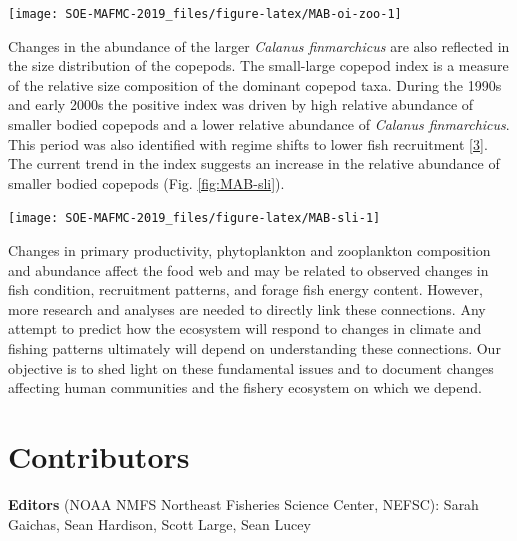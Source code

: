 \documentclass[10pt,]{article}
\let\origfigure\figure
\let\endorigfigure\endfigure
\renewenvironment{figure}[1][2] {
    \expandafter\origfigure\expandafter[H]
} {
    \endorigfigure
}
\begin{document}
\begin{figure}

{\centering \texttt{[image: SOE-MAFMC-2019\_files/figure-latex/MAB-oi-zoo-1]} 

}

\caption{Seasonal abundance of key zooplankton species in the MAB.}\label{fig:MAB-oi-zoo}
\end{figure}

Changes in the abundance of the larger \emph{Calanus finmarchicus} are
also reflected in the size distribution of the copepods. The small-large
copepod index is a measure of the relative size composition of the
dominant copepod taxa. During the 1990s and early 2000s the positive
index was driven by high relative abundance of smaller bodied copepods
and a lower relative abundance of \emph{Calanus finmarchicus}. This
period was also identified with regime shifts to lower fish recruitment
{[}\protect\hyperlink{ref-perretti_regime_2017}{3}{]}. The current trend
in the index suggests an increase in the relative abundance of smaller
bodied copepods (Fig. \ref{fig:MAB-sli}).

\begin{figure}

{\centering \texttt{[image: SOE-MAFMC-2019\_files/figure-latex/MAB-sli-1]} 

}

\caption{MAB small-large zooplankton index and the annual primary production anomaly.}\label{fig:MAB-sli}
\end{figure}

Changes in primary productivity, phytoplankton and zooplankton
composition and abundance affect the food web and may be related to
observed changes in fish condition, recruitment patterns, and forage
fish energy content. However, more research and analyses are needed to
directly link these connections. Any attempt to predict how the
ecosystem will respond to changes in climate and fishing patterns
ultimately will depend on understanding these connections. Our objective
is to shed light on these fundamental issues and to document changes
affecting human communities and the fishery ecosystem on which we
depend.

\section{Contributors}\label{contributors}

\textbf{Editors} (NOAA NMFS Northeast Fisheries Science Center, NEFSC):
Sarah Gaichas, Sean Hardison, Scott Large, Sean Lucey
\end{document}
